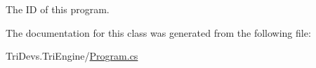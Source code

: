 The I\-D of this program. 



The documentation for this class was generated from the following file\-:\begin{DoxyCompactItemize}
\item 
Tri\-Devs.\-Tri\-Engine/\hyperlink{_program_8cs}{Program.\-cs}\end{DoxyCompactItemize}
